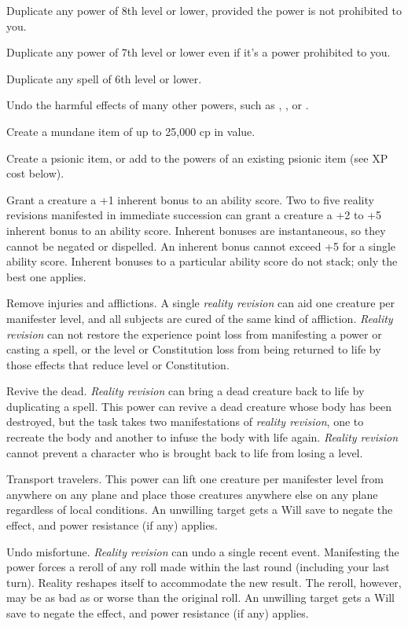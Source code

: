 {	\begin{itemize*}
	\item Duplicate any power of 8th level or lower, provided the power is not prohibited to you.
	\item Duplicate any power of 7th level or lower even if it's a power prohibited to you.
	\item Duplicate any spell of 6th level or lower.
	\item Undo the harmful effects of many other powers, such as , , or .
	\item Create a mundane item of up to 25,000 cp in value.
	\item Create a psionic item, or add to the powers of an existing psionic item (see XP cost below).
	\item Grant a creature a +1 inherent bonus to an ability score. Two to five reality revisions manifested in immediate succession can grant a creature a +2 to +5 inherent bonus to an ability score. Inherent bonuses are instantaneous, so they cannot be negated or dispelled. An inherent bonus cannot exceed +5 for a single ability score. Inherent bonuses to a particular ability score do not stack; only the best one applies.
	\item Remove injuries and afflictions. A single \emph{reality revision} can aid one creature per manifester level, and all subjects are cured of the same kind of affliction. \emph{Reality revision} can not restore the experience point loss from manifesting a power or casting a spell, or the level or Constitution loss from being returned to life by those effects that reduce level or Constitution.
	\item Revive the dead. \emph{Reality revision} can bring a dead creature back to life by duplicating a  spell. This power can revive a dead creature whose body has been destroyed, but the task takes two manifestations of \emph{reality revision}, one to recreate the body and another to infuse the body with life again. \emph{Reality revision} cannot prevent a character who is brought back to life from losing a level.
	\item Transport travelers. This power can lift one creature per manifester level from anywhere on any plane and place those creatures anywhere else on any plane regardless of local conditions. An unwilling target gets a Will save to negate the effect, and power resistance (if any) applies.
	\item Undo misfortune. \emph{Reality revision} can undo a single recent event. Manifesting the power forces a reroll of any roll made within the last round (including your last turn). Reality reshapes itself to accommodate the new result. The reroll, however, may be as bad as or worse than the original roll. An unwilling target gets a Will save to negate the effect, and power resistance (if any) applies.
	\end{itemize*}

}
